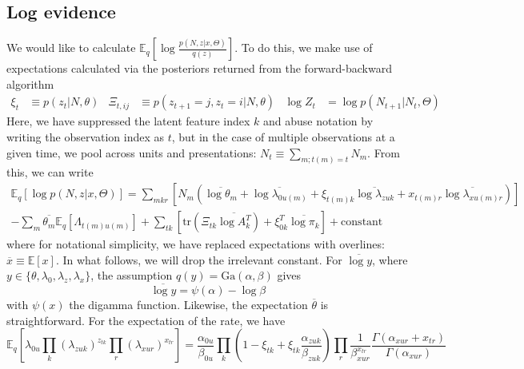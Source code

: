 \documentclass[10pt,letterpaper]{article}
\begin{document}
\subsection{Log evidence}
\label{sec:log_evidence}
We would like to calculate $\mathbb{E}_{q}\left[ \log \frac{p(N, z|x, \Theta)}{q(z)}\right]$. To do this, we make use of expectations calculated via the posteriors returned from the forward-backward algorithm
\begin{align}
    \xi_{t} &\equiv p(z_{t}|N, \theta) &
    \Xi_{t, ij} &\equiv p(z_{t+1} = j, z_{t} = i|N, \theta) &
    \log Z_{t} &= \log p(N_{t+1}|N_{t}, \Theta)
\end{align}
Here, we have suppressed the latent feature index $k$ and abuse notation by writing the observation index as $t$, but in the case of multiple observations at a given time, we pool across units and presentations: $N_t \equiv \sum_{m; t(m) = t} N_m$. From this, we can write
\begin{multline}
    \label{eq:log_evidence}
     \mathbb{E}_{q}\left[ \log p(N, z|x, \Theta) \right] =
     \sum_{mkr} \left[N_m \left(
        \overline{\log \theta_m} + \overline{\log \lambda_{0u(m)}} +
        \xi_{t(m)k}\overline{\log \lambda_{zuk}} +
        x_{t(m)r} \overline{\log \lambda_{xu(m)r}}
     \right) \right] \\
     - \sum_m \overline{\theta_m} \mathbb{E}_q\left[\Lambda_{t(m)u(m)} \right]
      + \sum_{tk} \left[ \text{tr}\left(\Xi_{tk} \overline{\log A_k^T} \right)
     + \xi_{0k}^T \overline{\log \pi_k}
     \right]
    + \text{constant}
 \end{multline}
where for notational simplicity, we have replaced expectations with overlines: $\overline{x} \equiv \mathbb{E}[x]$.
In what follows, we will drop the irrelevant constant. For $\overline{\log y}$, where $y \in \lbrace \theta, \lambda_0, \lambda_z, \lambda_x \rbrace$, the assumption $q(y) = \text{Ga}(\alpha, \beta)$ gives
\begin{equation}
    \overline{\log y} = \psi(\alpha) - \log \beta
\end{equation}
with $\psi(x)$ the digamma function. Likewise, the expectation $\overline{\theta}$ is straightforward. For the expectation of the rate, we have
\begin{equation}
    \label{eff_rate}
    \mathbb{E}_q\left[
        \lambda_{0u} \prod_k (\lambda_{zuk})^{z_{tk}} \prod_r (\lambda_{xur})^{x_{tr}}
    \right] = \frac{\alpha_{0u}}{\beta_{0u}}
    \prod_k \left(1 - \xi_{tk} + \xi_{tk} \frac{\alpha_{zuk}}{\beta_{zuk}} \right)
    \prod_r \frac{1}{\beta_{xur}^{x_{tr}}} \frac{\Gamma(\alpha_{xur} + x_{tr})}{\Gamma(\alpha_{xur})}
\end{equation}
\end{document}
